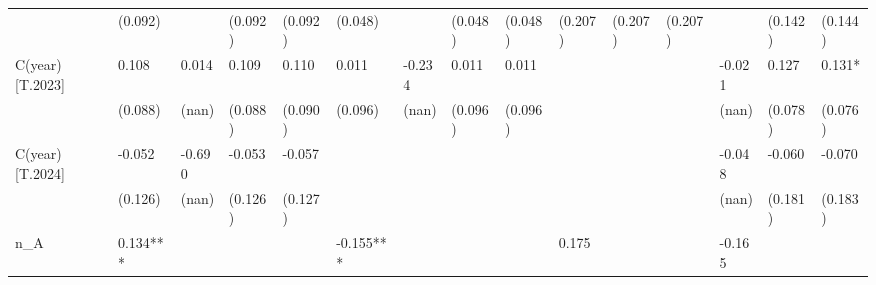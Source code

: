 \begin{table}
\begin{center}
\begin{tabular}{lllllllllllllll}
                  & (0.092)            &                    & (0.092)                & (0.092)             & (0.048)              &                      & (0.048)                  & (0.048)               & (0.207)              & (0.207)                  & (0.207)               &                               & (0.142)                                   & (0.144)                                 \\
C(year)[T.2023]   & 0.108              & 0.014              & 0.109                  & 0.110               & 0.011                & -0.234               & 0.011                    & 0.011                 &                      &                          &                       & -0.021                        & 0.127                                     & 0.131*                                  \\
                  & (0.088)            & (nan)              & (0.088)                & (0.090)             & (0.096)              & (nan)                & (0.096)                  & (0.096)               &                      &                          &                       & (nan)                         & (0.078)                                   & (0.076)                                 \\
C(year)[T.2024]   & -0.052             & -0.690             & -0.053                 & -0.057              &                      &                      &                          &                       &                      &                          &                       & -0.048                        & -0.060                                    & -0.070                                  \\
                  & (0.126)            & (nan)              & (0.126)                & (0.127)             &                      &                      &                          &                       &                      &                          &                       & (nan)                         & (0.181)                                   & (0.183)                                 \\
n\_A              & 0.134***           &                    &                        &                     & -0.155***            &                      &                          &                       & 0.175                &                          &                       & -0.165                        &                                           &                                         \\

\end{tabular}
\end{center}
\end{table}
